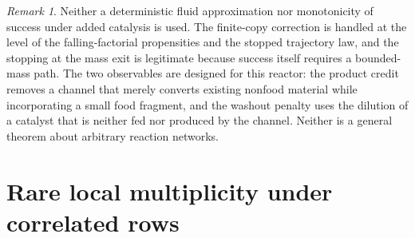 \documentclass[11pt,letterpaper]{article}
\theoremstyle{plain}
\theoremstyle{definition}
\theoremstyle{remark}
\newtheorem{remark}[theorem]{Remark}
\numberwithin{equation}{section}
\begin{document}
\begin{remark}
Neither a deterministic fluid approximation \cite{kurtz1972relationship,darling2008differential} nor monotonicity of success under added catalysis is used. The finite-copy correction is handled at the level of the falling-factorial propensities and the stopped trajectory law, and the stopping at the mass exit is legitimate because success itself requires a bounded-mass path. The two observables are designed for this reactor: the product credit removes a channel that merely converts existing nonfood material while incorporating a small food fragment, and the washout penalty uses the dilution of a catalyst that is neither fed nor produced by the channel. Neither is a general theorem about arbitrary reaction networks.
\end{remark}

\section{Rare local multiplicity under correlated rows}\label{sec:multiplicity}
\end{document}
